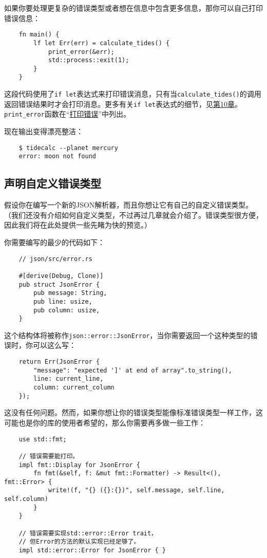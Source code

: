如果你要处理更复杂的错误类型或者想在信息中包含更多信息，那你可以自己打印错误信息：
\begin{verbatim}
    fn main() {
        lf let Err(err) = calculate_tides() {
            print_error(&err);
            std::process::exit(1);
        }
    }
\end{verbatim}

这段代码使用了\texttt{if let}表达式来打印错误消息，只有当\texttt{calculate\_tides()}的调用返回错误结果时才会打印消息。更多有关\texttt{if let}表达式的细节，见\hyperref[ch10]{第10章}。\texttt{print\_error}函数在“\hyperref[printerror]{打印错误}”中列出。

现在输出变得漂亮整洁：
\begin{verbatim}
    $ tidecalc --planet mercury
    error: moon not found
\end{verbatim}

\subsection{声明自定义错误类型}
假设你在编写一个新的JSON解析器，而且你想让它有自己的自定义错误类型。（我们还没有介绍如何自定义类型，不过再过几章就会介绍了。错误类型很方便，因此我们将在此处提供一些先睹为快的预览。）

你需要编写的最少的代码如下：
\begin{verbatim}
    // json/src/error.rs

    #[derive(Debug, Clone)]
    pub struct JsonError {
        pub message: String,
        pub line: usize,
        pub column: usize,
    }
\end{verbatim}

这个结构体将被称作\texttt{json::error::JsonError}，当你需要返回一个这种类型的错误时，你可以这么写：
\begin{verbatim}
    return Err(JsonError {
        "message": "expected ']' at end of array".to_string(),
        line: current_line,
        column: current_column
    });
\end{verbatim}

这没有任何问题。然而，如果你想让你的错误类型能像标准错误类型一样工作，这可能也是你的库的使用者希望的，那么你需要再多做一些工作：
\begin{verbatim}
    use std::fmt;

    // 错误需要能打印。
    impl fmt::Display for JsonError {
        fn fmt(&self, f: &mut fmt::Formatter) -> Result<(), fmt::Error> {
            write!(f, "{} ({}:{})", self.message, self.line, self.column)
        }
    }

    // 错误需要实现std::error::Error trait，
    // 但Error的方法的默认实现已经足够了。
    impl std::error::Error for JsonError { }
\end{verbatim}

